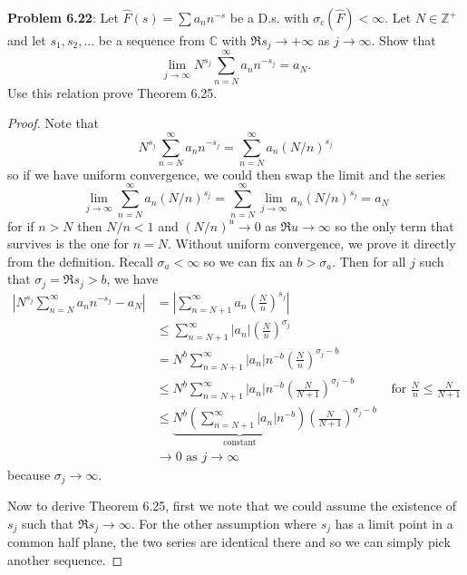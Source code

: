 \documentclass[12pt]{article}
\newcommand{\Fhat}{\widehat{F}}
\newcommand{\Abs}[1]{\left| #1 \right|}
\newcommand{\Z}{\mathbb{Z}}
\newcommand{\C}{\mathbb{C}}
\begin{document}
\fi

\textbf{Problem 6.22}: Let $\Fhat(s) = \sum a_n n^{-s}$ be a D.s. with $\sigma_c(\Fhat) < \infty$. Let $N \in \Z^+$ and let $s_1, s_2, ...$ be a sequence from $\C$ with $\Re s_j \rightarrow +\infty$ as $j \rightarrow \infty$. Show that
$$\lim_{j \rightarrow \infty} N^{s_j} \sum_{n = N}^{\infty} a_n n^{-s_j} = a_N.$$
Use this relation prove Theorem 6.25.

\begin{proof}
Note that
$$N^{s_j} \sum_{n = N}^{\infty} a_n n^{-s_j} = \sum_{n = N}^{\infty} a_n (N/n)^{s_j}$$
so if we have uniform convergence, we could then swap the limit and the series
$$\lim_{j \rightarrow \infty} \sum_{n = N}^{\infty} a_n (N/n)^{s_j} = \sum_{n = N}^{\infty} \lim_{j \rightarrow \infty} a_n (N/n)^{s_j} = a_N$$
for if $n > N$ then $N/n < 1$ and $(N/n)^{u} \rightarrow 0$ as $\Re u \rightarrow \infty$ so the only term that survives is the one for $n = N$. Without uniform convergence, we prove it directly from the definition. Recall $\sigma_a < \infty$ so we can fix an $b > \sigma_a$. Then for all $j$ such that $\sigma_j = \Re s_j > b$, we have
\begin{align*}
\Abs{ N^{s_j} \sum_{n = N}^{\infty} a_n n^{-s_j} - a_N } &= \Abs{ \sum_{n = N + 1}^{\infty} a_n \left(\frac{N}{n}\right)^{s_j} }\\
&\leq \sum_{n = N + 1}^{\infty} |a_n| \left(\frac{N}{n}\right)^{\sigma_j}\\
&= N^b \sum_{n = N + 1}^{\infty} |a_n| n^{-b} \left(\frac{N}{n}\right)^{\sigma_j - b}\\
&\leq N^b \sum_{n = N + 1}^{\infty} |a_n| n^{-b} \left(\frac{N}{N + 1}\right)^{\sigma_j - b} &\text{ for } \frac{N}{n} \leq \frac{N}{N+1}\\
&\leq \underbrace{N^b \left( \sum_{n = N + 1}^{\infty} |a_n| n^{-b} \right)}_{\text{constant}} \left(\frac{N}{N + 1}\right)^{\sigma_j - b}\\
&\rightarrow 0 \text{ as } j \rightarrow \infty
\end{align*}
because $\sigma_j \rightarrow \infty$.

Now to derive Theorem 6.25, first we note that we could assume the existence of $s_j$ such that $\Re s_j \rightarrow \infty$. For the other assumption where $s_j$ has a limit point in a common half plane, the two series are identical there and so we can simply pick another sequence.


\end{proof}
\end{document}
